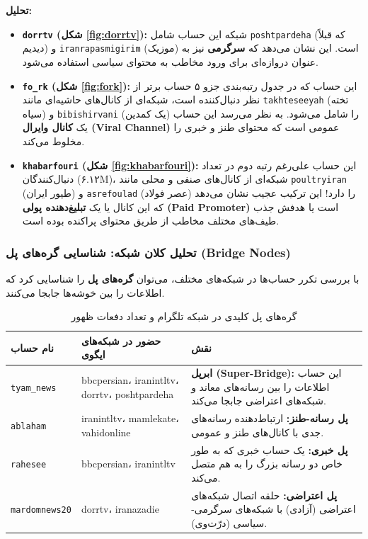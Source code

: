 \documentclass{article}
\begin{document}
\textbf{تحلیل:}
\begin{itemize}
	\item \textbf{\texttt{dorrtv} (شکل \ref{fig:dorrtv}):} شبکه این حساب شامل \texttt{poshtpardeha} (که قبلاً دیدیم) و \texttt{iranrapasmigirim} (موزیک) است. این نشان می‌دهد که \textbf{سرگرمی} نیز به عنوان دروازه‌ای برای ورود مخاطب به محتوای سیاسی استفاده می‌شود.
	\item \textbf{\texttt{fo\_rk} (شکل \ref{fig:fork}):} این حساب که در جدول رتبه‌بندی جزو ۵ حساب برتر از نظر دنبال‌کننده است، شبکه‌ای از کانال‌های حاشیه‌ای مانند \texttt{takhteseeyah} (تخته سیاه) و \texttt{bibishirvani} (یک کمدین) را شامل می‌شود. به نظر می‌رسد این حساب یک \textbf{کانال وایرال (Viral Channel)} عمومی است که محتوای طنز و خبری را مخلوط می‌کند.
	\item \textbf{\texttt{khabarfouri} (شکل \ref{fig:khabarfouri}):} این حساب علی‌رغم رتبه دوم در تعداد دنبال‌کنندگان (۶.۱۲M)، شبکه‌ای از کانال‌های صنفی و محلی مانند \texttt{poultryiran} (طیور ایران) و \texttt{asrefoulad} (عصر فولاد) را دارد! این ترکیب عجیب نشان می‌دهد که این کانال یا یک \textbf{تبلیغ‌دهنده پولی (Paid Promoter)} است یا هدفش جذب طیف‌های مختلف مخاطب از طریق محتوای پراکنده بوده است.
\end{itemize}

\subsubsection{تحلیل کلان شبکه: شناسایی گره‌های پل (Bridge Nodes)}
با بررسی تکرر حساب‌ها در شبکه‌های مختلف، می‌توان \textbf{گره‌های پل} را شناسایی کرد که اطلاعات را بین خوشه‌ها جابجا می‌کنند.

\begin{longtable}{p{3cm} p{4cm} p{7cm}}
	\caption{گره‌های پل کلیدی در شبکه تلگرام و تعداد دفعات ظهور}
	\label{tab:bridges} \\
	\toprule
	\textbf{نام حساب} & \textbf{حضور در شبکه‌های ایگوی} & \textbf{نقش} \\
	\midrule
	\texttt{tyam\_news} & bbcpersian، iranintltv، dorrtv، poshtpardeha 
	& \textbf{ابرپل (Super-Bridge):} این حساب اطلاعات را بین رسانه‌های معاند و شبکه‌های اعتراضی جابجا می‌کند. \\
	
	\texttt{ablaham} & iranintltv، mamlekate، vahidonline 
	& \textbf{پل رسانه-طنز:} ارتباط‌دهنده رسانه‌های جدی با کانال‌های طنز و عمومی. \\
	
	\texttt{rahesee} & bbcpersian، iranintltv 
	& \textbf{پل خبری:} یک حساب خبری که به طور خاص دو رسانه بزرگ را به هم متصل می‌کند. \\
	
	\texttt{mardomnews20} & dorrtv، iranazadie 
	& \textbf{پل اعتراضی:} حلقه اتصال شبکه‌های اعتراضی (آزادی) با شبکه‌های سرگرمی-سیاسی (درّت‌وی). \\
	\bottomrule
\end{longtable}
\end{document}
